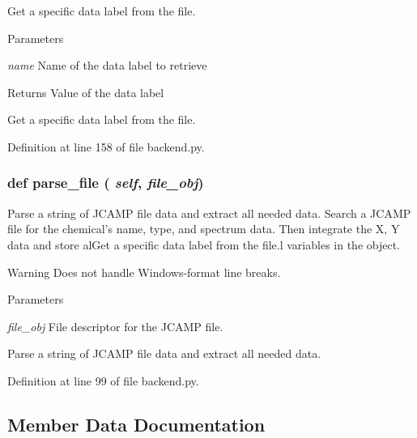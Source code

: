 Get a specific data label from the file. 
\begin{DoxyParams}{Parameters}
\item[{\em name}]Name of the data label to retrieve \end{DoxyParams}
\begin{DoxyReturn}{Returns}
Value of the data label\begin{DoxyVerb}Get a specific data label from the file.\end{DoxyVerb}
 
\end{DoxyReturn}


Definition at line 158 of file backend.py.\hypertarget{classbackend_1_1_spectrum_a14401ccceaf67f005506de0a8320b089}{
\subsubsection[{parse\_\-file}]{\setlength{\rightskip}{0pt plus 5cm}def parse\_\-file ( {\em self}, \/   {\em file\_\-obj})}}
\label{classbackend_1_1_spectrum_a14401ccceaf67f005506de0a8320b089}


Parse a string of JCAMP file data and extract all needed data. Search a JCAMP file for the chemical's name, type, and spectrum data. Then integrate the X, Y data and store alGet a specific data label from the file.l variables in the object. \begin{DoxyWarning}{Warning}
Does not handle Windows-\/format line breaks.
\end{DoxyWarning}

\begin{DoxyParams}{Parameters}
\item[{\em file\_\-obj}]File descriptor for the JCAMP file.\begin{DoxyVerb}Parse a string of JCAMP file data and extract all needed data.\end{DoxyVerb}
 \end{DoxyParams}


Definition at line 99 of file backend.py.

\subsection{Member Data Documentation}
\hypertarget{classbackend_1_1_spectrum_a77c112c599aae1eeb8d54936bb435177}{
\subsubsection[{chemical\_\-name}]{}}
\label{classbackend_1_1_spectrum_a77c112c599aae1eeb8d54936bb435177}


